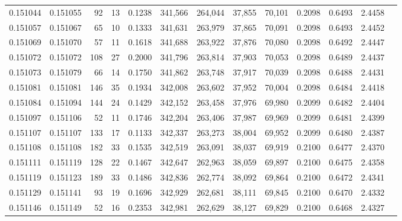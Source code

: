 \begin{tabular}{rrrrrrrrrrrrr}
0.151044 & 0.151055 &    92 &  13 &                                     0.1238 & 341,566 & 264,044 &  37,855 &  70,101 & 0.2098 & 0.6493 & 2.4458 \\
0.151057 & 0.151067 &    65 &  10 &                                     0.1333 & 341,631 & 263,979 &  37,865 &  70,091 & 0.2098 & 0.6493 & 2.4452 \\
0.151069 & 0.151070 &    57 &  11 &                                     0.1618 & 341,688 & 263,922 &  37,876 &  70,080 & 0.2098 & 0.6492 & 2.4447 \\
0.151072 & 0.151072 &   108 &  27 &                                     0.2000 & 341,796 & 263,814 &  37,903 &  70,053 & 0.2098 & 0.6489 & 2.4437 \\
0.151073 & 0.151079 &    66 &  14 &                                     0.1750 & 341,862 & 263,748 &  37,917 &  70,039 & 0.2098 & 0.6488 & 2.4431 \\
0.151081 & 0.151081 &   146 &  35 &                                     0.1934 & 342,008 & 263,602 &  37,952 &  70,004 & 0.2098 & 0.6484 & 2.4418 \\
0.151084 & 0.151094 &   144 &  24 &                                     0.1429 & 342,152 & 263,458 &  37,976 &  69,980 & 0.2099 & 0.6482 & 2.4404 \\
0.151097 & 0.151106 &    52 &  11 &                                     0.1746 & 342,204 & 263,406 &  37,987 &  69,969 & 0.2099 & 0.6481 & 2.4399 \\
0.151107 & 0.151107 &   133 &  17 &                                     0.1133 & 342,337 & 263,273 &  38,004 &  69,952 & 0.2099 & 0.6480 & 2.4387 \\
0.151108 & 0.151108 &   182 &  33 &                                     0.1535 & 342,519 & 263,091 &  38,037 &  69,919 & 0.2100 & 0.6477 & 2.4370 \\
0.151111 & 0.151119 &   128 &  22 &                                     0.1467 & 342,647 & 262,963 &  38,059 &  69,897 & 0.2100 & 0.6475 & 2.4358 \\
0.151119 & 0.151123 &   189 &  33 &                                     0.1486 & 342,836 & 262,774 &  38,092 &  69,864 & 0.2100 & 0.6472 & 2.4341 \\
0.151129 & 0.151141 &    93 &  19 &                                     0.1696 & 342,929 & 262,681 &  38,111 &  69,845 & 0.2100 & 0.6470 & 2.4332 \\
0.151146 & 0.151149 &    52 &  16 &                                     0.2353 & 342,981 & 262,629 &  38,127 &  69,829 & 0.2100 & 0.6468 & 2.4327 \\

\end{tabular}
